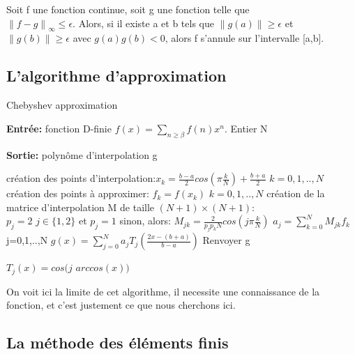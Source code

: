 \documentclass[a4paper,10.5pt]{article}
\begin{document}
	
	\begin{proposition}
		Soit f une fonction continue, soit g une fonction telle que \\
		$\left\|f-g \right\|_{\infty} \leq \epsilon$. Alors, si il existe a et b tels que $\left\|g(a)\right\| \geq \epsilon$ et $\left\|g(b)\right\| \geq \epsilon$ avec $g(a)g(b) < 0$, alors f s'annule sur l'intervalle [a,b].
		
	\end{proposition}
	
	\subsection{L'algorithme d'approximation}
	
	
	\begin{algorithm}
		\caption{Chebyshev approximation}
		
		\vspace{2mm}
		
		\textbf{Entrée:} fonction D-finie $f(x)=\sum_{n \geq\beta} f(n)x^{n}$. Entier N
		
		\textbf{Sortie:} polynôme d'interpolation g
		
		\begin{algorithmic}[1]
			
			\STATE création des points d'interpolation:$x_{k}=\frac{b-a}{2}cos(\pi\frac{k}{N})+\frac{b+a}{2}$  $k=0,1,..,N$
			\STATE création des points à approximer: $f_{k}=f(x_{k})$ $k=0,1,..,N$
			\STATE création de la matrice d'interpolation M de taille $(N+1)\times (N+1)$:\\
			$p_{j}=2$ $j\in\{1,2\}$ et $p_{j}=1$ sinon, alors:
			$M_{jk}=\frac{2}{p_{j}p_{k}N}cos(j\pi\frac{k}{N})$
			\STATE $a_{j}=\sum_{k=0}^{N}M_{jk}f_{k}$ j=0,1,..,N
			\STATE $g(x)=\sum_{j=0}^{N}a_{j}T_{j}(\frac{2x-(b+a)}{b-a})$
			\STATE Renvoyer g
		\end{algorithmic}
		
	\end{algorithm}
	
	\noindent $T_{j}(x)=cos(j$  $arccos(x))$
	
	\noindent On voit ici la limite de cet algorithme, il necessite une connaissance de la fonction, et c'est justement ce que nous cherchons ici.
	
	\subsection{La méthode des éléments finis}
	
\end{document}
